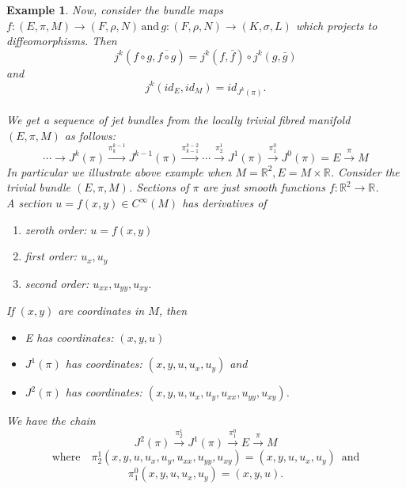 \documentclass{amsart}
\theoremstyle{plain}
\newtheorem{exam}{Example}
\begin{document}
\begin{exam}
	Now, consider the bundle maps $f: (E, \pi, M) \rightarrow (F, \rho, N) \, \text{and} \, g: (F, \rho, N) \rightarrow (K, \sigma, L)$  which projects to diffeomorphisms. Then
	$$j^k(f \circ g, \overline{f \circ g}) = j^k(f, \bar{f}) \circ j^k(g, \bar{g})$$ and $$ j^k(id_E,id_M) = id_{J^k(\pi)}.$$
	\\  
	We get a sequence of jet bundles from the locally trivial fibred manifold $(E, \pi, M)$ as follows:
	$$\cdots \rightarrow J^k(\pi) \stackrel{\pi_k^{k-1}}{\rightarrow}
	J^{k-1}(\pi) \stackrel{\pi_{k-1}^{k-2}}{\rightarrow} \cdots \stackrel{\pi_{2}^{1}}{\rightarrow}J^1(\pi) \stackrel{\pi_{1}^{0}}{\rightarrow} J^0(\pi) = E  \stackrel{\pi}{\rightarrow} M $$
	In particular we illustrate above example when $M = \mathbb{R}^2, E = M \times \mathbb{R}$. Consider the trivial bundle $(E, \pi, M)$. Sections of $\pi$ are just smooth functions $f:\mathbb{R}^2 \rightarrow\mathbb{R}$.\\
	A section $ u = f(x,y) \in C^{\infty}(M)$ has derivatives of
	\begin{enumerate}
		\item zeroth order: $u = f(x,y)$
		\item first order: $u_x, u_y$
		\item second order: $u_{xx}, u_{yy},u_{xy}.$
	\end{enumerate}
	If $(x,y) $ are coordinates in $M$, then\\
	\begin{itemize}
		\item	E has coordinates: $(x,y,u)$\\
		\item	$J^1(\pi)$ has coordinates: $(x,y,u,u_x,u_y)$  and \\
		\item	$J^2(\pi)$ has coordinates: $(x,y,u,u_x,u_y,u_{xx}, u_{yy},u_{xy})$.\\
	\end{itemize}
	We have the chain $$ J^2(\pi) \stackrel{\pi_2^1}{\rightarrow} J^1(\pi)  \stackrel{\pi_1^0}{\rightarrow} E  \stackrel{\pi}{\rightarrow} M$$
	$$ \text{where} \quad
	\pi_2^1(x,y,u,u_x,u_y,u_{xx}, u_{yy},u_{xy}) = (x,y,u,u_x,u_y) \,\,\, \text{and}$$ $$
	\pi_1^0(x,y,u,u_x,u_y) = (x,y,u).$$
	

\end{exam}
\end{document}

